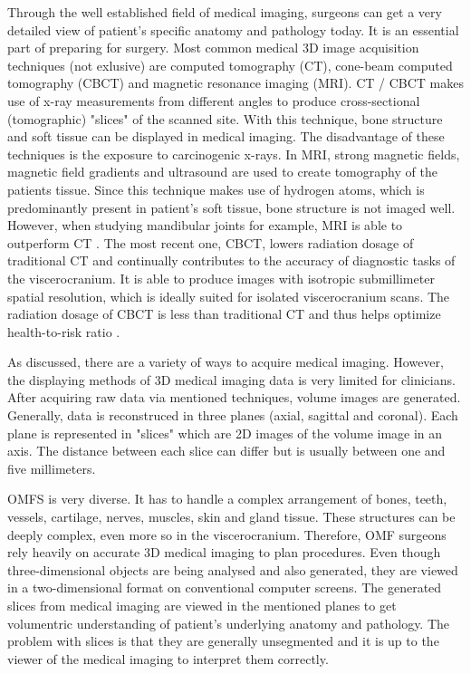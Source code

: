 Through the well established field of medical imaging, surgeons can get a very detailed view of patient’s specific anatomy and pathology today. 
It is an essential part of preparing for surgery.
Most common medical 3D image acquisition techniques (not exlusive) are computed tomography (CT), cone-beam computed tomography (CBCT) and magnetic resonance imaging (MRI).
CT / CBCT makes use of x-ray measurements from different angles to produce cross-sectional (tomographic) "slices" of the scanned site.
With this technique, bone structure and soft tissue can be displayed in medical imaging.
The disadvantage of these techniques is the exposure to carcinogenic x-rays.
In MRI, strong magnetic fields, magnetic field gradients and ultrasound are used to create tomography of the patients tissue.
Since this technique makes use of hydrogen atoms, which is predominantly present in patient's soft tissue, bone structure is not imaged well.
However, when studying mandibular joints for example, MRI is able to outperform CT \cite{RN65}.
The most recent one, CBCT, lowers radiation dosage of traditional CT and continually contributes to the accuracy of diagnostic tasks of the viscerocranium.
It is able to produce images with isotropic submillimeter spatial resolution, which is ideally suited for isolated viscerocranium scans. 
The radiation dosage of CBCT is less than traditional CT and thus helps optimize health-to-risk ratio \cite{WHITE2008689}.

As discussed, there are a variety of ways to acquire medical imaging.
However, the displaying methods of 3D medical imaging data is very limited for clinicians.
After acquiring raw data via mentioned techniques, volume images are generated. 
Generally, data is reconstruced in three planes (axial, sagittal and coronal).
Each plane is represented in "slices" which are 2D images of the volume image in an axis.
The distance between each slice can differ but is usually between one and five millimeters.

OMFS is very diverse. It has to handle a complex arrangement of bones, teeth, vessels, cartilage, nerves, muscles, skin and gland tissue.
These structures can be deeply complex, even more so in the viscerocranium.
Therefore, OMF surgeons rely heavily on accurate 3D medical imaging to plan procedures.
Even though three-dimensional objects are being analysed and also generated, they are viewed in a two-dimensional format on conventional computer screens.
The generated slices from medical imaging are viewed in the mentioned planes to get volumentric understanding of patient's underlying anatomy and pathology.
The problem with slices is that they are generally unsegmented and it is up to the viewer of the medical imaging to interpret them correctly.

